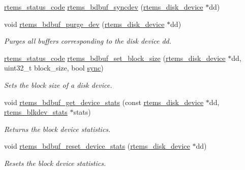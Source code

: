 \begin{DoxyCompactItemize}
\item 
\mbox{\hyperlink{group__ClassicStatus_ga545d41846817eaba6143d52ee4d9e9fe}{rtems\+\_\+status\+\_\+code}} \mbox{\hyperlink{group__rtems__bdbuf_ga1f02deb0d0ca33a6b9da04b9f3f2078d}{rtems\+\_\+bdbuf\+\_\+syncdev}} (\mbox{\hyperlink{structrtems__disk__device}{rtems\+\_\+disk\+\_\+device}} $\ast$dd)
\item 
void \mbox{\hyperlink{group__rtems__bdbuf_gadc7712bcd488ea249f4a84d362126d46}{rtems\+\_\+bdbuf\+\_\+purge\+\_\+dev}} (\mbox{\hyperlink{structrtems__disk__device}{rtems\+\_\+disk\+\_\+device}} $\ast$dd)
\begin{DoxyCompactList}\small\item\em Purges all buffers corresponding to the disk device {\itshape dd}. \end{DoxyCompactList}\item 
\mbox{\hyperlink{group__ClassicStatus_ga545d41846817eaba6143d52ee4d9e9fe}{rtems\+\_\+status\+\_\+code}} \mbox{\hyperlink{group__rtems__bdbuf_ga649b3b4fb368921f579a0204552a7a60}{rtems\+\_\+bdbuf\+\_\+set\+\_\+block\+\_\+size}} (\mbox{\hyperlink{structrtems__disk__device}{rtems\+\_\+disk\+\_\+device}} $\ast$dd, uint32\+\_\+t block\+\_\+size, bool \mbox{\hyperlink{sync_8c_ac4fa2e6d36e97983d62b9377cc4f6c73}{sync}})
\begin{DoxyCompactList}\small\item\em Sets the block size of a disk device. \end{DoxyCompactList}\item 
\mbox{\label{group__rtems__bdbuf_ga9dd6ce1ba113683d019a29d04861f33d}} 
void \mbox{\hyperlink{group__rtems__bdbuf_ga9dd6ce1ba113683d019a29d04861f33d}{rtems\+\_\+bdbuf\+\_\+get\+\_\+device\+\_\+stats}} (const \mbox{\hyperlink{structrtems__disk__device}{rtems\+\_\+disk\+\_\+device}} $\ast$dd, \mbox{\hyperlink{structrtems__blkdev__stats}{rtems\+\_\+blkdev\+\_\+stats}} $\ast$stats)
\begin{DoxyCompactList}\small\item\em Returns the block device statistics. \end{DoxyCompactList}\item 
\mbox{\label{group__rtems__bdbuf_ga2f88a5110e6063af34b36063edd291f1}} 
void \mbox{\hyperlink{group__rtems__bdbuf_ga2f88a5110e6063af34b36063edd291f1}{rtems\+\_\+bdbuf\+\_\+reset\+\_\+device\+\_\+stats}} (\mbox{\hyperlink{structrtems__disk__device}{rtems\+\_\+disk\+\_\+device}} $\ast$dd)
\begin{DoxyCompactList}\small\item\em Resets the block device statistics. \end{DoxyCompactList}\end{DoxyCompactItemize}
